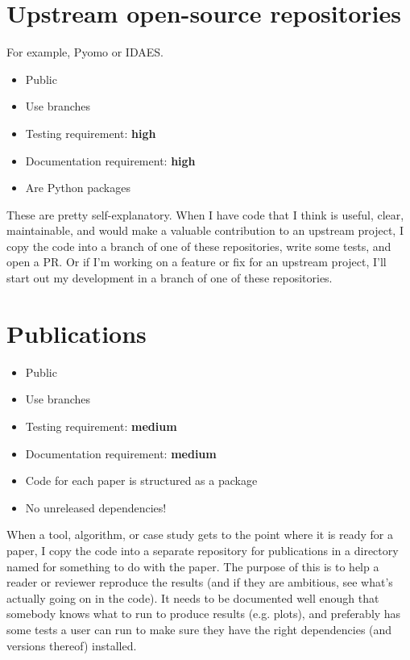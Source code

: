 \documentclass{article}
\begin{document}
\section{Upstream open-source repositories}
For example, Pyomo or IDAES.
\begin{itemize}
  \item Public
  \item Use branches
  \item Testing requirement: {\color{red}\bf high}
  \item Documentation requirement: {\color{red}\bf high}
  \item Are Python packages
\end{itemize}

These are pretty self-explanatory. When I have code that I think
is useful, clear, maintainable, and would make a valuable
contribution to an upstream project, I copy the code into a branch
of one of these repositories, write some tests, and open a PR.
Or if I'm working on a feature or fix for an upstream project,
I'll start out my development in a branch of one of these
repositories.

\section{Publications}
\begin{itemize}
  \item Public
  \item Use branches
  \item Testing requirement: {\color{purple}\bf medium}
  \item Documentation requirement: {\color{purple}\bf medium}
  \item Code for each paper is structured as a package
  \item No unreleased dependencies!
\end{itemize}

When a tool, algorithm, or case study gets to the point where it is
ready for a paper, I copy the code into a separate repository for
publications in a directory named for something to do with the paper.
The purpose of this is to help a reader or reviewer reproduce the
results (and if they are ambitious, see what's actually going on
in the code).
It needs to be documented well enough that somebody knows what to run
to produce results (e.g. plots), and preferably has some tests a
user can run to make sure they have the right dependencies
(and versions thereof) installed.
\end{document}
